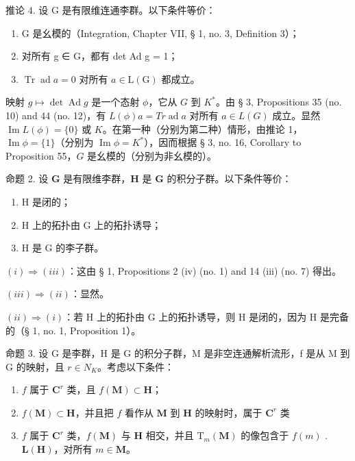 推论 4. 设 G 是有限维连通李群。以下条件等价：

\begin{enumerate}
\def\labelenumi{(\roman{enumi})}
\item
  G 是幺模的（Integration, Chapter VII, § 1, no. 3, Definition 3）；
\item
  对所有 g ∈ G，都有 det Ad g = 1；
\item
  \(\operatorname{Tr} \operatorname{ad} a = 0\) 对所有 \(a \in \mathrm{L}(\mathrm{G})\) 都成立。
\end{enumerate}

映射 \(g \mapsto \operatorname{det} \operatorname{Ad} g\) 是一个态射 \(\phi\)，它从 \(G\) 到 \(K^*\)。由 § 3, Propositions 35 (no. 10) and 44 (no. 12)，有 \(L(\phi)a = Tr\operatorname{ad} a\) 对所有 \(a \in L(G)\) 成立。显然 \(\operatorname{Im} L(\phi) = \{0\}\) 或 \(K\)。在第一种（分别为第二种）情形，由推论 1，\(\operatorname{Im} \phi = \{1\}\)（分别为 \(\operatorname{Im} \phi = K^*\)），因而根据 § 3, no. 16, Corollary to Proposition 55，\(G\) 是幺模的（分别为非幺模的）。

命题 2. 设 \(\mathbf{G}\) 是有限维李群，\(\mathbf{H}\) 是 \(\mathbf{G}\) 的积分子群。以下条件等价：

\begin{enumerate}
\def\labelenumi{(\roman{enumi})}
\item
  H 是闭的；
\item
  H 上的拓扑由 G 上的拓扑诱导；
\item
  H 是 G 的李子群。
\end{enumerate}

\((i) \Rightarrow (iii)\)：这由 § 1, Propositions 2 (iv) (no. 1) and 14 (iii) (no. 7) 得出。

\((iii) \Rightarrow (ii)\)：显然。

\((ii) \Rightarrow (i)\)：若 H 上的拓扑由 G 上的拓扑诱导，则 H 是闭的，因为 H 是完备的（§ 1, no. 1, Proposition 1）。

命题 3. 设 G 是李群，H 是 G 的积分子群，M 是非空连通解析流形，f 是从 M 到 G 的映射，且 \(r \in N_{K}\)。考虑以下条件：

\begin{enumerate}
\def\labelenumi{(\roman{enumi})}
\item
  \(f\) 属于 \(\mathbf{C}^r\) 类，且 \(f(\mathbf{M})\subset \mathbf{H}\)；
\item
  \(f(\mathbf{M})\subset \mathbf{H}\)，并且把 \(f\) 看作从 \(\mathbf{M}\) 到 \(\mathbf{H}\) 的映射时，属于 \(\mathbf{C}^r\) 类
\item
  \(f\) 属于 \(\mathbf{C}^r\) 类，\(f(\mathbf{M})\) 与 \(\mathbf{H}\) 相交，并且 \(\mathrm{T}_m(\mathbf{M})\) 的像包含于 \(f(m)\) . \(\mathbf{L}(\mathbf{H})\)，对所有 \(m \in \mathbf{M}\)。
\end{enumerate}

